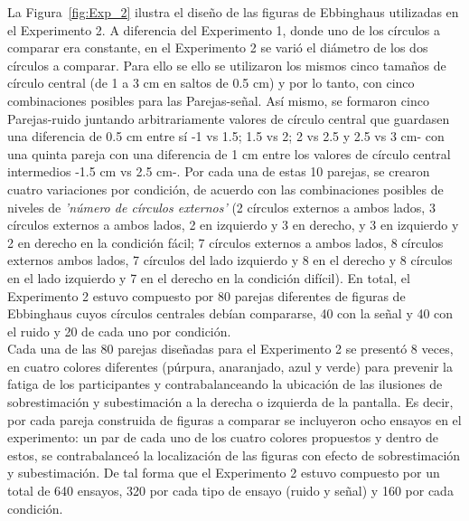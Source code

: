 \begin{itemize}
La Figura~\ref{fig:Exp_2} ilustra el diseño de las figuras de Ebbinghaus utilizadas en el Experimento 2. A diferencia del Experimento 1, donde uno de los círculos a comparar era constante, en el Experimento 2 se varió el diámetro de los dos círculos a comparar. Para ello se ello se utilizaron los mismos cinco tamaños de círculo central (de 1 a 3 cm en saltos de 0.5 cm) y por lo tanto, con cinco combinaciones posibles para las Parejas-señal. Así mismo, se formaron cinco Parejas-ruido juntando arbitrariamente valores de círculo central que guardasen una diferencia de 0.5 cm entre sí -1 vs 1.5; 1.5 vs 2; 2 vs 2.5 y 2.5 vs 3 cm- con una quinta pareja con una diferencia de 1 cm entre los valores de círculo central intermedios -1.5 cm vs 2.5 cm-. Por cada una de estas 10 parejas, se crearon cuatro variaciones por condición, de acuerdo con las combinaciones posibles de niveles de \textit{'número de círculos externos'} (2 círculos externos a ambos lados, 3 círculos externos a ambos lados, 2 en izquierdo y 3 en derecho, y 3 en izquierdo y 2 en derecho en la condición fácil; 7 círculos externos a ambos lados, 8 círculos externos ambos lados, 7 círculos del lado izquierdo y 8 en el derecho y 8 círculos en el lado izquierdo y 7 en el derecho en la condición difícil). En total, el Experimento 2 estuvo compuesto por 80 parejas diferentes de figuras de Ebbinghaus cuyos círculos centrales debían compararse, 40 con la señal y 40 con el ruido y 20 de cada uno por condición.\\

Cada una de las 80 parejas diseñadas para el Experimento 2 se presentó 8 veces, en cuatro colores diferentes (púrpura, anaranjado, azul y verde) para prevenir la fatiga de los participantes y contrabalanceando la ubicación de las ilusiones de sobrestimación y subestimación a la derecha o izquierda de la pantalla. Es decir, por cada pareja construida de figuras a comparar se incluyeron ocho ensayos en el experimento: un par de cada uno de los cuatro colores propuestos y dentro de estos, se contrabalanceó la localización de las figuras con efecto de sobrestimación y subestimación. De tal forma que el Experimento 2 estuvo compuesto por un total de 640 ensayos, 320 por cada tipo de ensayo (ruido y señal) y 160 por cada condición.\\ 


\end{itemize}
